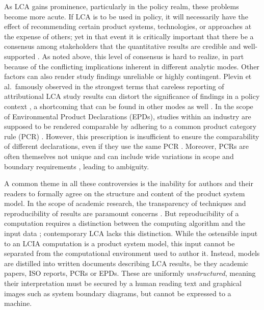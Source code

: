 As LCA gains prominence, particularly in the policy realm, these problems become more acute.  If LCA is to be used in policy, it will necessarily have the effect of recommending certain product systems, technologies, or approaches at the expense of others; yet in that event it is critically important that there be a consensus among stakeholders that the quantitative results are credible and well-supported \citep{Rainville_2015, McManus_2015}.  As noted above, this level of consensus is hard to realize, in part because of the conflicting implications inherent in different analytic modes.
Other factors can also render study findings unreliable or highly contingent.  Plevin et al.\ famously observed in the strongest terms that careless reporting of attributional LCA study results can distort the significance of findings in a policy context \citep{Plevin_2013}, a shortcoming that can be found in other modes as well \citep{Brandao_2014}.  In the scope of Environmental Product Declarations (EPDs), studies within an industry are supposed to be rendered comparable by adhering to a common product category rule (PCR) \citep{Fet_2006}.  However, this prescription is insufficient to ensure the comparability of different declarations, even if they use the same PCR \citep{Modahl_2012}.  Moreover, PCRs are often themselves not unique and can include wide variations in scope and boundary requirements \citep{Subramanian_2012}, leading to ambiguity.  %

A common theme in all these controversies is the inability for authors and their readers to formally agree on the structure and content of the product system model.  In the scope of academic research, the transparency of techniques and reproducibility of results are paramount concerns \citep{Mesirov_2010}.  But reproducibility of a computation requires a distinction between the computing algorithm and the input data \citep{Buckheit_1995, Fomel_2009}; contemporary LCA lacks this distinction.  While the ostensible input to an LCIA computation is a product system model, this input cannot be separated from the computational environment used to author it.  Instead, models are distilled into written documents describing LCA results, be they academic papers, ISO reports, PCRs or EPDs.  These are uniformly \textit{unstructured}, meaning their interpretation must be secured by a human reading text and graphical images such as system boundary diagrams, but cannot be expressed to a machine.  

